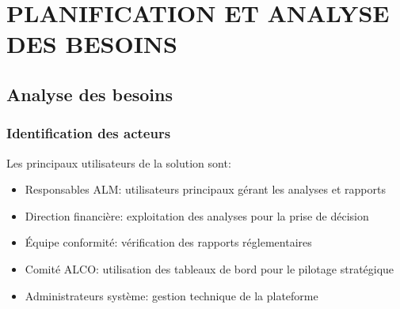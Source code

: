 \documentclass[12pt,a4paper]{report}
\begin{document}
\chapter{PLANIFICATION ET ANALYSE DES BESOINS}

\section{Analyse des besoins}

\subsection{Identification des acteurs}
Les principaux utilisateurs de la solution sont:
\begin{itemize}
    \item Responsables ALM: utilisateurs principaux gérant les analyses et rapports
    \item Direction financière: exploitation des analyses pour la prise de décision
    \item Équipe conformité: vérification des rapports réglementaires
    \item Comité ALCO: utilisation des tableaux de bord pour le pilotage stratégique
    \item Administrateurs système: gestion technique de la plateforme
\end{itemize}
\end{document}
